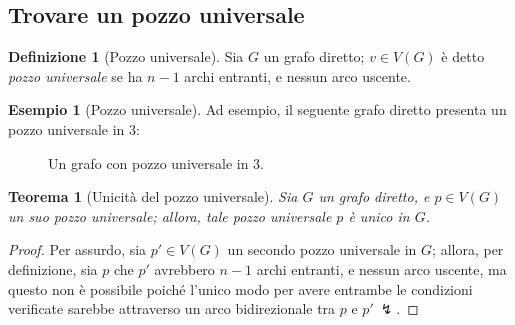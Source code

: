 \documentclass[14pt]{extreport}
\newtheorem{theorem}{Teorema}[subsection]
\theoremstyle{definition}
\newtheorem{definition}{Definizione}[subsection]
\theoremstyle{definition}
\newtheorem{example}{Esempio}[subsection]
\begin{document}
\subsection{Trovare un pozzo universale}

\begin{definition}[Pozzo universale]
    Sia $G$ un grafo diretto; $v \in V(G)$ è detto \textit{pozzo universale} se ha $n - 1$ archi entranti, e nessun arco uscente.
\end{definition}

\begin{example}[Pozzo universale]
    Ad esempio, il seguente grafo diretto presenta un pozzo universale in $3$:

    \begin{figure}[H]
        \centering
        \caption{Un grafo con pozzo universale in $3$.}
    \end{figure}
\end{example}

\begin{theorem}[Unicità del pozzo universale]
    Sia $G$ un grafo diretto, e $p \in V(G)$ un suo pozzo universale; allora, tale pozzo universale $p$ è unico in $G$.
\end{theorem}

\begin{proof}
    Per assurdo, sia $p' \in V(G)$ un secondo pozzo universale in $G$; allora, per definizione, sia $p$ che $p'$ avrebbero $n - 1$ archi entranti, e nessun arco uscente, ma questo non è possibile poiché l'unico modo per avere entrambe le condizioni verificate sarebbe attraverso un arco bidirezionale tra $p$ e $p' \ \lightning$.
\end{proof}
\end{document}

